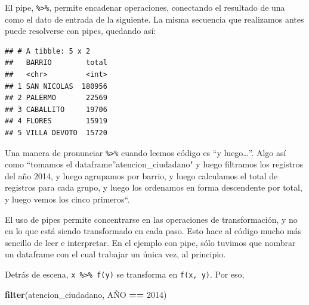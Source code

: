 \documentclass[]{book}
\newenvironment{Shaded}{\begin{snugshade}}{\end{snugshade}}
\newcommand{\KeywordTok}[1]{\textcolor[rgb]{0.13,0.29,0.53}{\textbf{#1}}}
\newcommand{\DataTypeTok}[1]{\textcolor[rgb]{0.13,0.29,0.53}{#1}}
\newcommand{\DecValTok}[1]{\textcolor[rgb]{0.00,0.00,0.81}{#1}}
\newcommand{\StringTok}[1]{\textcolor[rgb]{0.31,0.60,0.02}{#1}}
\newcommand{\OperatorTok}[1]{\textcolor[rgb]{0.81,0.36,0.00}{\textbf{#1}}}
\newcommand{\NormalTok}[1]{#1}
\begin{document}
El pipe, \texttt{\%\textgreater{}\%}, permite encadenar operaciones,
conectando el resultado de una como el dato de entrada de la siguiente.
La misma secuencia que realizamos antes puede resolverse con pipes,
quedando así:

\begin{Shaded}
\end{Shaded}

\begin{verbatim}
## # A tibble: 5 x 2
##   BARRIO        total
##   <chr>         <int>
## 1 SAN NICOLAS  180956
## 2 PALERMO       22569
## 3 CABALLITO     19706
## 4 FLORES        15919
## 5 VILLA DEVOTO  15720
\end{verbatim}

Una manera de pronunciar \texttt{\%\textgreater{}\%} cuando leemos
código es ``y luego\ldots{}''. Algo así como ``tomamos el
dataframe''atencion\_ciudadano" y luego filtramos los registros del año
2014, y luego agrupamos por barrio, y luego calculamos el total de
registros para cada grupo, y luego los ordenamos en forma descendente
por total, y luego vemos los cinco primeros``.

El uso de pipes permite concentrarse en las operaciones de
transformación, y no en lo que está siendo transformado en cada paso.
Esto hace al código mucho más sencillo de leer e interpretar. En el
ejemplo con pipe, sólo tuvimos que nombrar un dataframe con el cual
trabajar un única vez, al principio.

Detrás de escena, \texttt{x\ \%\textgreater{}\%\ f(y)} se transforma en
\texttt{f(x,\ y)}. Por eso,

\begin{Shaded}
\begin{Highlighting}[]
\KeywordTok{filter}\NormalTok{(atencion_ciudadano, AÑO }\OperatorTok{==}\StringTok{ }\DecValTok{2014}\NormalTok{)}
\end{Highlighting}
\end{Shaded}
\end{document}
